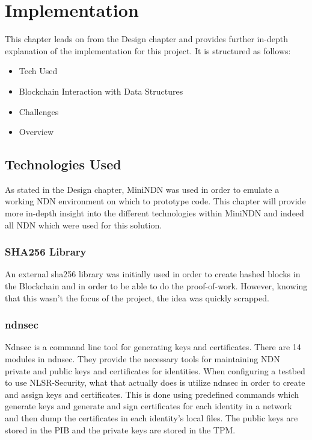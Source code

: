\chapter{Implementation}

This chapter leads on from the Design chapter and provides further in-depth explanation of the implementation for this project. It is structured as follows:
\begin{itemize}
\item Tech Used
\item Blockchain Interaction with Data Structures
\item Challenges
\item Overview
\end{itemize}
\vfill
\section{Technologies Used}
As stated in the Design chapter, MiniNDN was used in order to emulate a working NDN environment on which to prototype code. This chapter will provide more in-depth insight into the different technologies within MiniNDN and indeed all NDN which were used for this solution.\par 
\subsection{SHA256 Library}
An external sha256 library was initially used in order to create hashed blocks in the Blockchain and in order to be able to do the proof-of-work. However, knowing that this wasn't the focus of the project, the idea was quickly scrapped.
\subsection{ndnsec}
Ndnsec is a command line tool for generating keys and certificates. There are 14 modules in ndnsec. They provide the necessary tools for maintaining NDN private and public keys and certificates for identities. When configuring a testbed to use NLSR-Security, what that actually does is utilize ndnsec in order to create and assign keys and certificates. This is done using predefined commands which generate keys and generate and sign certificates for each identity in a network and then dump the certificates in each identity's local files. The public keys are stored in the PIB and the private keys are stored in the TPM.
